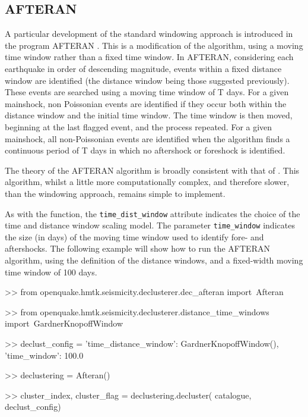 \subsection{AFTERAN \parencite{Musson1999PSHABalkan}}

A particular development of the standard windowing approach is introduced in the program AFTERAN \parencite{Musson1999PSHABalkan}. This is a modification of the \textcite{GardnerKnopoff1974} algorithm, using a moving time window rather than a fixed time window. In AFTERAN, considering each earthquake in order of descending magnitude, events within a fixed distance window are identified (the distance window being those suggested previously). These events are searched using a moving time window of T days. For a given mainshock, non Poissonian events are identified if they occur both within the distance window and the initial time window. The time window is then moved, beginning at the last flagged event, and the process repeated. For a given mainshock, all non-Poissonian events are identified when the algorithm finds a continuous period of T days in which no aftershock or foreshock is identified. 

The theory of the AFTERAN algorithm is broadly consistent with that of \textcite{GardnerKnopoff1974}. This algorithm, whilst a little more computationally complex, and therefore slower, than the \textcite{GardnerKnopoff1974} windowing approach, remains simple to implement. 

As with the \textcite{GardnerKnopoff1974} function, the \verb=time_dist_window= attribute indicates the choice of the time and distance window scaling model. The parameter \verb=time_window= indicates the size (in days) of the moving time window used to identify fore- and aftershocks. The following example will show how to run the AFTERAN algorithm, using the  \textcite{GardnerKnopoff1974} definition of the distance windows, and a fixed-width moving time window of 100 days.

  
\begin{python}[frame=single]

>> from openquake.hmtk.seismicity.declusterer.dec_afteran import\
    Afteran

>> from openquake.hmtk.seismicity.declusterer.distance_time_windows import\
    GardnerKnopoffWindow   
 
>> declust_config = {
    'time_distance_window': GardnerKnopoffWindow(),
    'time_window': 100.0} 

>> declustering = Afteran()

>> cluster_index, cluster_flag = declustering.decluster(
    catalogue,
    declust_config)
\end{python} 

